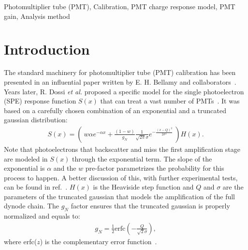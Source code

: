 \documentclass[preprint,12pt]{elsarticle}
\begin{document}
\begin{frontmatter}
\begin{abstract}
\end{abstract}



\begin{keyword}
Photomultiplier tube (PMT), Calibration, PMT charge response model, PMT gain, Analysis method


\end{keyword}

\end{frontmatter}


\section{Introduction}
\label{sec:intro}

The standard machinery for photomultiplier tube (PMT) calibration has been presented in an influential paper written by E. H. Bellamy and collaborators~\cite{bellamy}. 
Years later, R. Dossi \emph{et al.} proposed a specific model for the single photoelectron (SPE) response function $S(x)$ that can treat a vast number of PMTs~\cite{dossi}. 
It was based on a carefully chosen combination of an exponential and a truncated gaussian distribution:
\begin{align}
S(x) =    \left( \ w \alpha e^{-\alpha x } + \frac{(1-w)}{g_N} \frac{1}{\sqrt{2\pi}\sigma} e^{ - \frac{( x - Q )^2}{2\sigma^2}} \ \right) H(x).       \label{eq:S}
\end{align}
Note that photoelectrons that backscatter and miss the first amplification stage are modeled in $S(x)$ through the exponential term. 
The slope of the exponential is $\alpha$ and the $w$ pre-factor parametrizes the probability for this process to happen. 
A better discussion of this, with further experimental tests, can be found in ref.~\cite{dossi}. 
$H(x)$ is the Heaviside step function and $Q$ and $\sigma$ are the parameters of the truncated gaussian that models the amplification of the full dynode chain.  
The $g_N$ factor ensures that the truncated gaussian is properly normalized and equals to:
\begin{align}
g_N = \frac{1}{2} \textrm{erfc} \left( - \frac{Q}{\sqrt{2}\sigma} \right), 
\end{align}
where erfc($z$) is the complementary error function~\cite{error}. 
\end{document}
